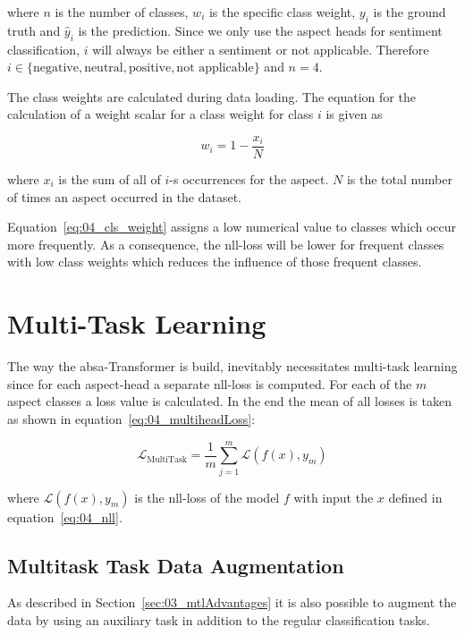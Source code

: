 where $n$ is the number of classes, $w_i$ is the specific class weight, $y_i$ is the ground truth and $\hat{y}_i$ is the prediction. Since we only use the aspect heads for sentiment classification, $i$ will always be either a sentiment or not applicable. Therefore $i \in \{\text{negative}, \text{neutral}, \text{positive}, \text{not applicable\}}$ and $n=4$.
\medskip

The class weights are calculated during data loading. The equation for the calculation of a weight scalar for a class weight for class $i$ is given as

\begin{equation}
	w_i = 1 - \frac{x_i}{N}
\label{eq:04_cls_weight}
\end{equation}

where $x_i$ is the sum of all of $i$-s occurrences for the aspect. $N$ is the total number of times an aspect occurred in the dataset.
\medskip

Equation~\ref{eq:04_cls_weight} assigns a low numerical value to classes which occur more frequently. As a consequence, the \gls{nll}-loss will be lower for frequent classes with low class weights which reduces the influence of those frequent classes.  

\section{Multi-Task Learning}
\label{sec:04_multitask}
The way the \gls{absa}-Transformer is build, inevitably necessitates multi-task learning since for each aspect-head a separate \gls{nll}-loss is computed. For each of the $m$ aspect classes a loss value is calculated. In the end the mean of all losses is taken as shown in equation~\ref{eq:04_multiheadLoss}:

\begin{equation}
\mathcal{L}_\text{MultiTask} = \frac{1}{m}\sum_{j=1}^{m}\mathcal{L}(f(x), y_m)
\label{eq:04_multiheadLoss}
\end{equation}

where $\mathcal{L}(f(x), y_m)$ is the \gls{nll}-loss of the model $f$ with input the $x$ defined in equation~\ref{eq:04_nll}.

\subsection{Multitask Task Data Augmentation}

As described in Section~\ref{sec:03_mtlAdvantages} it is also possible to augment the data by using an auxiliary task in addition to the regular classification tasks.

